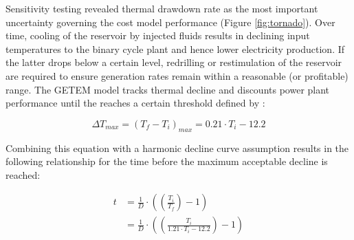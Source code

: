 Sensitivity testing revealed thermal drawdown rate as the most important uncertainty governing the cost model performance (Figure \ref{fig:tornado}). Over time, cooling of the reservoir by injected fluids results in declining input temperatures to the binary cycle plant and hence lower electricity production. If the latter drops below a certain level, redrilling or restimulation of the reservoir are required to ensure generation rates remain within a reasonable (or profitable) range. The GETEM model tracks thermal decline and discounts power plant performance until the reaches a certain threshold defined by \citep{entingh_volume_2006}:

\begin{equation}
\label{eq:drawdown_threshold}
    \Delta T_{max} = (T_f-T_i)_{max} = 0.21 \cdot T_i - 12.2
\end{equation}

Combining this equation with a harmonic decline curve assumption results in the following relationship for the time before the maximum acceptable decline is reached:

\begin{equation}
\label{eq:redevelop_time}
\begin{aligned}
    t &= \frac{1}{D} \cdot 
    \left( {
    \left( {\frac{T_i}{T_f} }\right) - 1
    }\right)\\
    &= \frac{1}{D} \cdot 
    \left( {
    \left( {\frac{T_i}{1.21 \cdot T_i - 12.2}
    }\right) - 1
    }\right) 
\end{aligned}
\end{equation}

